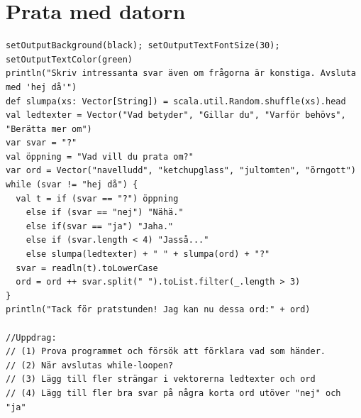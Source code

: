 \chapter{Prata med datorn}
\begin{lstlisting}[basicstyle={\ttfamily\fontsize{13}{16}\selectfont},numbers=none]
setOutputBackground(black); setOutputTextFontSize(30); setOutputTextColor(green)
println("Skriv intressanta svar även om frågorna är konstiga. Avsluta med 'hej då'")
def slumpa(xs: Vector[String]) = scala.util.Random.shuffle(xs).head
val ledtexter = Vector("Vad betyder", "Gillar du", "Varför behövs", "Berätta mer om")
var svar = "?"
val öppning = "Vad vill du prata om?"
var ord = Vector("navelludd", "ketchupglass", "jultomten", "örngott") 
while (svar != "hej då") {
  val t = if (svar == "?") öppning 
    else if (svar == "nej") "Nähä." 
    else if(svar == "ja") "Jaha." 
    else if (svar.length < 4) "Jasså..." 
    else slumpa(ledtexter) + " " + slumpa(ord) + "?"
  svar = readln(t).toLowerCase
  ord = ord ++ svar.split(" ").toList.filter(_.length > 3) 
} 
println("Tack för pratstunden! Jag kan nu dessa ord:" + ord)

//Uppdrag:
// (1) Prova programmet och försök att förklara vad som händer.
// (2) När avslutas while-loopen?
// (3) Lägg till fler strängar i vektorerna ledtexter och ord
// (4) Lägg till fler bra svar på några korta ord utöver "nej" och "ja"
\end{lstlisting}
        
